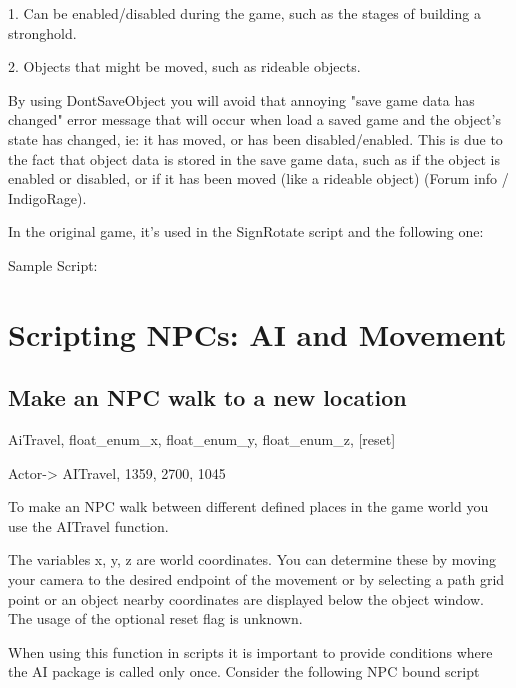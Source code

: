 1. Can be enabled/disabled during the game, such as the stages of
building a stronghold.

2. Objects that might be moved, such as rideable objects.

By using DontSaveObject you will avoid that annoying "save game data has
changed" error message that will occur when load a saved game and the
object's state has changed, ie: it has moved, or has been
disabled/enabled. This is due to the fact that object data is stored in
the save game data, such as if the object is enabled or disabled, or if
it has been moved (like a rideable object) (Forum info / IndigoRage).

In the original game, it's used in the SignRotate script and the
following one:

Sample Script:



\hypertarget{scripting-npcs-ai-and-movement}{%
\section{\texorpdfstring{\hfill\break
Scripting NPCs: AI and
Movement}{ Scripting NPCs: AI and Movement}}\label{scripting-npcs-ai-and-movement}}

\hypertarget{make-an-npc-walk-to-a-new-location}{%
\subsection{Make an NPC walk to a new
location}\label{make-an-npc-walk-to-a-new-location}}

AiTravel, float\_enum\_x, float\_enum\_y, float\_enum\_z, {[}reset{]}

Actor-> AITravel, 1359, 2700, 1045

To make an NPC walk between different defined places in the game world
you use the AITravel function.

The variables x, y, z are world coordinates. You can determine these by
moving your camera to the desired endpoint of the movement or by
selecting a path grid point or an object nearby coordinates are
displayed below the object window. The usage of the optional reset flag
is unknown.

When using this function in scripts it is important to provide
conditions where the AI package is called only once. Consider the
following NPC bound script



